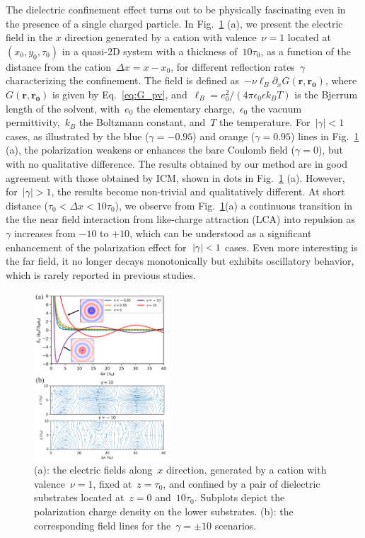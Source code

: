 The dielectric confinement effect turns out to be physically fascinating even in the presence of a single charged particle. 
In Fig.~\ref{fig:force_x} (a), we present the electric field in the $x$ direction generated by a cation with valence~$\nu=1$ located at~$(x_0, y_0, \tau_0)$ in a quasi-2D system with a thickness of~$10\tau_0$, as a function of the distance from the cation~$\Delta x=x-x_0$, for different reflection rates~$\gamma$ characterizing the confinement. 
The field is defined as~$-\nu\ell_B\partial_x G(\mathbf{r}, \mathbf{r_0})$, where~$G(\mathbf{r}, \mathbf{r_0})$ is given by Eq.~\eqref{eq:G_pv}, and~$\ell_B=e_0^2/(4\pi\epsilon_0\epsilon k_B T)$ is the Bjerrum length of the solvent, with~$e_0$ the elementary charge,~$\epsilon_0$ the vacuum permittivity,~$k_B$ the Boltzmann constant, and~$T$ the temperature. 
For~$\vert\gamma\vert<1$ cases, as illustrated by the blue ($\gamma=-0.95$) and orange ($\gamma=0.95$) lines in Fig.~\ref{fig:force_x} (a), the polarization weakens or enhances the bare Coulomb field ($\gamma=0$), but with no qualitative difference. 
The results obtained by our method are in good agreement with those obtained by ICM, shown in dots in Fig.~\ref{fig:force_x} (a). 
However, for~$\vert\gamma\vert>1$, the results become non-trivial and qualitatively different. 
At short distance ($\tau_0<\Delta x < 10\tau_0$), we observe from Fig.~\ref{fig:force_x}(a) a continuous transition in the the near field interaction from like-charge attraction (LCA) into repulsion as~$\gamma$ increases from $-10$ to $+10$,
which can be understood as a significant enhancement of the polarization effect for~$\lvert\gamma\rvert<1$ cases.
Even more interesting is the far field, it no longer decays monotonically but exhibits oscillatory behavior, which is rarely reported in previous studies.

\begin{figure}[htbp]
	\centering
	\includegraphics[width=0.45\textwidth]{figs/fig2.pdf}
	\caption{(a): the electric fields along~$x$ direction, generated by a cation with valence~$\nu=1$, fixed at~$z=\tau_0$, and confined by a pair of dielectric substrates located at~$z=0$ and~$10\tau_0$. Subplots depict the polarization charge density on the lower substrates. 
    (b): the corresponding field lines for the~$\gamma=\pm10$ scenarios.
		\label{fig:force_x}
            }
\end{figure}

